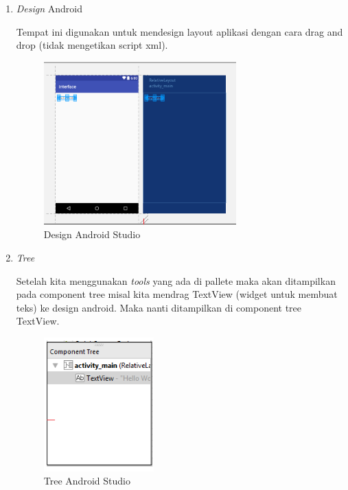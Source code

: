 \begin{enumerate}
    \item\textit{ Design} Android
    \par Tempat ini digunakan untuk mendesign layout aplikasi dengan cara drag and drop (tidak mengetikan script xml).
    \begin{figure}[H]
    \centering
    \includegraphics[width=0.7\textwidth]{figures/android18.png}
    \caption{Design Android Studio}
    \label{print}
    \end{figure}
    
    \item \textit{Tree}
    \par Setelah kita menggunakan \textit{tools} yang ada di pallete maka akan ditampilkan pada component tree misal kita mendrag TextView (widget untuk membuat teks) ke design android. Maka nanti ditampilkan di component tree TextView. 
    \begin{figure}[H]
    \centering
    \includegraphics[width=0.4\textwidth]{figures/android19.png}
    \caption{Tree Android Studio}
    \label{print}
    \end{figure}
    

\end{enumerate}
